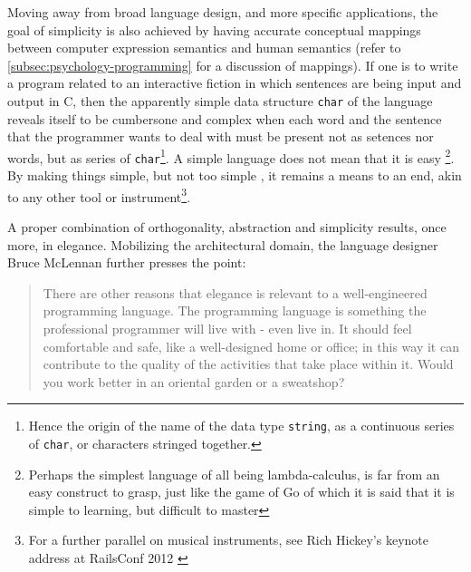 Moving away from broad language design, and more specific applications, the goal of simplicity is also achieved by having accurate conceptual mappings between computer expression semantics and human semantics (refer to \ref{subsec:psychology-programming} for a discussion of mappings). If one is to write a program related to an interactive fiction in which sentences are being input and output in C, then the apparently simple data structure \lstinline{char} of the language reveals itself to be cumbersone and complex when each word and the sentence that the programmer wants to deal with must be present not as setences nor words, but as series of \lstinline{char}\footnote{Hence the origin of the name of the data type \lstinline{string}, as a continuous series of \lstinline{char}, or characters stringed together.}. A simple language does not mean that it is easy \footnote{Perhaps the simplest language of all being lambda-calculus, is far from an easy construct to grasp, just like the game of Go of which it is said that it is simple to learning, but difficult to master}. By making things simple, but not too simple \citep{biancuzzi_masterminds_2009}, it remains a means to an end, akin to any other tool or instrument\footnote{For a further parallel on musical instruments, see Rich Hickey's keynote address at RailsConf 2012 \citep{confreaks_rails_2012}}.

A proper combination of orthogonality, abstraction and simplicity results, once more, in elegance. Mobilizing the architectural domain, the language designer Bruce McLennan further presses the point:

\begin{quote}
  There are other reasons that elegance is relevant to a well-engineered programming language. The programming language is something the professional programmer will live with - even live in. It should feel comfortable and safe, like a well-designed home or office; in this way it can contribute to the quality of the activities that take place within it. Would you work better in an oriental garden or a sweatshop? \citep{mclennan_who_1997}
\end{quote}


